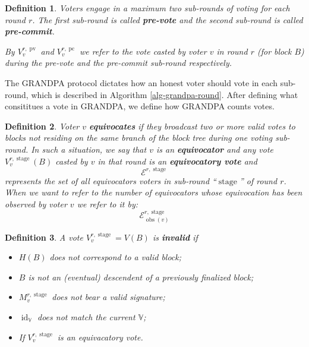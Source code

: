 \documentclass{article}
\newcommand{\tmop}[1]{\ensuremath{\operatorname{#1}}}
\newcommand{\tmstrong}[1]{\textbf{#1}}
\newcommand{\tmtextbf}[1]{{\bfseries{#1}}}
\newenvironment{itemizedot}{\begin{itemize} \renewcommand{\labelitemi}{$\bullet$}\renewcommand{\labelitemii}{$\bullet$}\renewcommand{\labelitemiii}{$\bullet$}\renewcommand{\labelitemiv}{$\bullet$}}{\end{itemize}}
\newtheorem{definition}{Definition}
\providecommand{\tmop}[1]{\ensuremath{\mathrm{#1}}}
\providecommand{\tmstrong}[1]{\tmtextbf{#1}}
\providecommand{\tmtextbf}[1]{\tmtextbf{#1}}
\newtheorem{definition}{Definition}
\begin{document}
\begin{definition}
  Voters engage in a maximum two sub-rounds of voting for each round $r$. The
  first sub-round is called {\tmstrong{pre-vote}} and the second sub-round is
  called {\tmstrong{pre-commit}}.
  
  By {\tmstrong{$V_v^{r, \tmop{pv}}$}} and {\tmstrong{$V_v^{r, \tmop{pc}}$}}
  we refer to the vote casted by voter $v$ in round $r$ (for block $B$) during
  the pre-vote and the pre-commit sub-round respectively.
\end{definition}

The GRANDPA protocol dictates how an honest voter should vote in each
sub-round, which is described in Algorithm \ref{alg-grandpa-round}. After
defining what consititues a vote in GRANDPA, we define how GRANDPA counts
votes.

\begin{definition}
  Voter $v$ {\tmstrong{equivocates}} if they broadcast two or more valid votes
  to blocks not residing on the same branch of the block tree during one
  voting sub-round. In such a situation, we say that $v$ is an
  {\tmstrong{equivocator}} and any vote $V_v^{r, \tmop{stage}} (B)$ casted by
  $v$ in that round is an {\tmstrong{equivocatory vote}} and
  \[ \mathcal{E}^{r, \tmop{stage}} \]
  represents the set of all equivocators voters in sub-round
  ``$\tmop{stage}$'' of round $r$. When we want to refer to the number of
  equivocators whose equivocation has been observed by voter $v$ we refer to
  it by:
  \[ \mathcal{E}^{r, \tmop{stage}}_{\tmop{obs} (v)} \]
\end{definition}

\begin{definition}
  A vote $V_v^{r, \tmop{stage}} = V (B)$ is {\tmstrong{invalid}} if
  \begin{itemize}
    \begin{itemizedot}
      \item $H (B)$ does not correspond to a valid block;
      
      \item $B$ is not an (eventual) descendent of a previously finalized
      block;
      
      \item $M^{r, \tmop{stage}}_v$ does not bear a valid signature;
      
      \item $\tmop{id}_{\mathbb{V}}$ does not match the current $\mathbb{V}$;
      
      \item If $V_v^{r, \tmop{stage}}$ is an equivacatory vote.
    \end{itemizedot}
  \end{itemize}
\end{definition}
\end{document}
